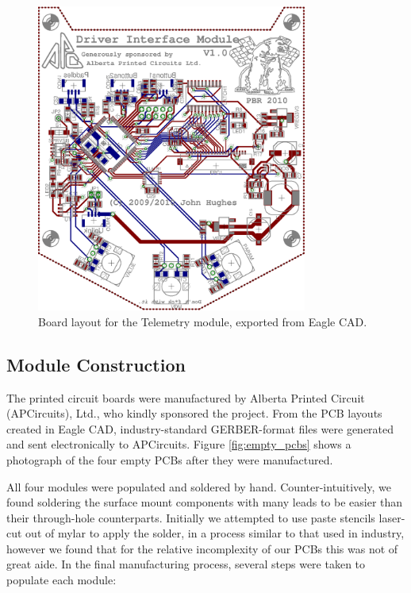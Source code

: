 \begin{figure}[h]
  \centering
  \includegraphics[width=3.5in,keepaspectratio]{implementation/figures/driver_interface_layout.eps}
  \caption{Board layout for the Telemetry module, exported from Eagle CAD.}
  \label{fig:driver_interface_layout}
\end{figure}

\subsection{Module Construction}

The printed circuit boards were manufactured by Alberta Printed Circuit (APCircuits), Ltd., who kindly sponsored the project. From the PCB layouts created in Eagle CAD, industry-standard GERBER-format files were generated and sent electronically to APCircuits. Figure \ref{fig:empty_pcbs} shows a photograph of the four empty PCBs after they were manufactured.

All four modules were populated and soldered by hand. Counter-intuitively, we found soldering the surface mount components with many leads to be easier than their through-hole counterparts. Initially we attempted to use paste stencils laser-cut out of mylar to apply the solder, in a process similar to that used in industry, however we found that for the relative incomplexity of our PCBs this was not of great aide. In the final manufacturing process, several steps were taken to populate each module:

